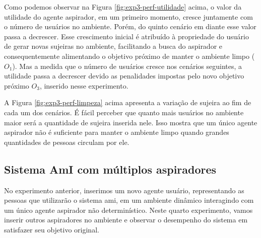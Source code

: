 Como podemos observar na Figura \ref{fig:exp3-perf-utilidade} acima, o valor da utilidade do agente aspirador, em um primeiro momento, cresce juntamente com o número de usuários no ambiente. Porém, do quinto cenário em diante esse valor passa a decrescer. Esse crescimento inicial é atribuído à propriedade do usuário de gerar novas sujeiras no ambiente, facilitando a busca do aspirador e consequentemente alimentando o objetivo próximo de manter o ambiente limpo ($O_1$). Mas a medida que o número de usuários cresce nos cenários seguintes, a utilidade passa a decrescer devido as penalidades impostas pelo novo objetivo próximo $O_3$, inserido nesse experimento. 

\begin{figure}[h!]
    \centering
\end{figure}

A Figura \ref{fig:exp3-perf-limpeza} acima apresenta a variação de sujeira ao fim de cada um dos cenários.  É fácil perceber que quanto mais usuários no ambiente maior será a quantidade de sujeira inserida nele. Isso mostra que um único agente aspirador não é suficiente para manter o ambiente limpo quando grandes quantidades de pessoas circulam por ele.

\subsection{Sistema AmI com múltiplos aspiradores}
\label{sec:multi-asp}
No experimento anterior, inserimos um novo agente usuário, representando as pessoas que utilizarão o sistema \acrshort{ami}, em um ambiente dinâmico interagindo com um único agente aspirador não determinístico. Neste quarto experimento, vamos inserir outros aspiradores no ambiente e observar o desempenho do sistema em satisfazer seu objetivo original. 

